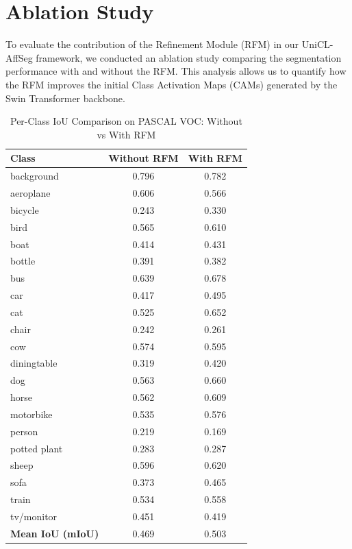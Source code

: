 \section{Ablation Study}
\label{sec:ablation_study}

To evaluate the contribution of the Refinement Module (RFM) in our UniCL-AffSeg framework, we conducted an ablation study comparing the segmentation performance with and without the RFM. This analysis allows us to quantify how the RFM improves the initial Class Activation Maps (CAMs) generated by the Swin Transformer backbone.

\begin{table}[ht!]
\centering
\caption{Per-Class IoU Comparison on PASCAL VOC: Without vs With RFM}
\begin{tabular}{|l|c|c|}
\hline
\textbf{Class} & \textbf{Without RFM} & \textbf{With RFM} \\ \hline
background    & 0.796 & 0.782 \\
aeroplane     & 0.606 & 0.566 \\
bicycle       & 0.243 & 0.330 \\
bird          & 0.565 & 0.610 \\
boat          & 0.414 & 0.431 \\
bottle        & 0.391 & 0.382 \\
bus           & 0.639 & 0.678 \\
car           & 0.417 & 0.495 \\
cat           & 0.525 & 0.652 \\
chair         & 0.242 & 0.261 \\
cow           & 0.574 & 0.595 \\
diningtable   & 0.319 & 0.420 \\
dog           & 0.563 & 0.660 \\
horse         & 0.562 & 0.609 \\
motorbike     & 0.535 & 0.576 \\
person        & 0.219 & 0.169 \\
potted plant  & 0.283 & 0.287 \\
sheep         & 0.596 & 0.620 \\
sofa          & 0.373 & 0.465 \\
train         & 0.534 & 0.558 \\
tv/monitor    & 0.451 & 0.419 \\ \hline
\textbf{Mean IoU (mIoU)} & 0.469 & 0.503 \\ \hline
\end{tabular}
\label{tab:ablation_rfm_comparison}
\end{table}

